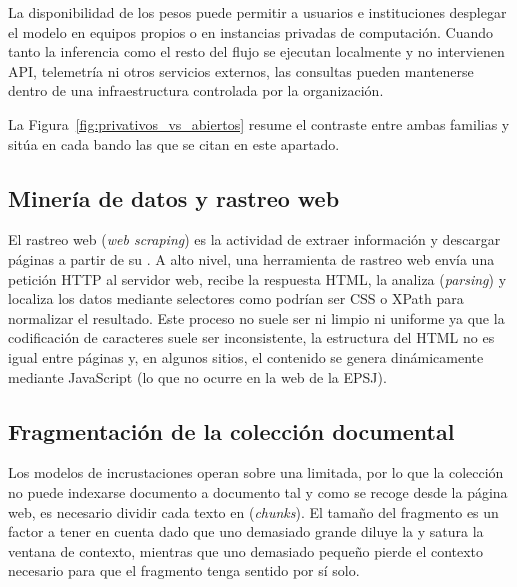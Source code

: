 La disponibilidad de los pesos puede permitir a usuarios e instituciones desplegar el modelo en equipos propios o en instancias privadas de computación. Cuando tanto la inferencia como el resto del flujo se ejecutan localmente y no intervienen API, telemetría ni otros servicios externos, las consultas pueden mantenerse dentro de una infraestructura controlada por la organización.

La Figura~\ref{fig:privativos_vs_abiertos} resume el contraste entre ambas familias y sitúa en cada bando las que se citan en este apartado.




\subsection[Minería de datos y rastreo web]{Minería de datos y rastreo web}
\label{subsec:mineria_rastreo}

El rastreo web (\textit{web scraping}) es la actividad de extraer información y descargar páginas a partir de su . A alto nivel, una herramienta de rastreo web envía una petición HTTP al servidor web, recibe la respuesta HTML, la analiza (\textit{parsing}) y localiza los datos mediante selectores como podrían ser CSS o XPath para normalizar el resultado. Este proceso no suele ser ni limpio ni uniforme ya que la codificación de caracteres suele ser inconsistente, la estructura del HTML no es igual entre páginas y, en algunos sitios, el contenido se genera dinámicamente mediante JavaScript (lo que no ocurre en la web de la EPSJ).


\subsection{Fragmentación de la colección documental}
\label{subsec:chunking_concepto}

Los modelos de incrustaciones operan sobre una  limitada, por lo que la colección
no puede indexarse documento a documento tal y como se recoge desde la página web, es necesario dividir cada texto en  (\textit{chunks}).
El tamaño del fragmento es un factor a tener en cuenta dado que uno demasiado grande diluye la  y satura la ventana de contexto,
mientras que uno demasiado pequeño pierde el contexto necesario para que el fragmento tenga sentido por sí solo.

